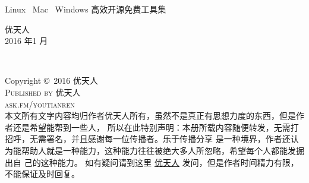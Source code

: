 \documentclass[11pt,fleqn]{book} %
\begin{document}

\begingroup
\thispagestyle{empty}
\centering
\vspace*{8cm}
\par\normalfont\fontsize{35}{35}\sffamily\selectfont
Linux \faLinux\ Mac \faApple\ Windows \faWindows 高效开源免费工具集\par %
\vspace*{0.5cm}
{\huge \faWeibo 优天人 \\ 2016 年1 月}\par %
\endgroup


\newpage
~\vfill
\thispagestyle{empty}

\noindent Copyright \copyright\ 2016 优天人\\ %

\noindent \textsc{Published by 优天人}\\ %

\noindent \textsc{ask.fm/youtianren}\\ %

\noindent                                                                                        本文所有文字内容均归作者优天人所有，虽然不是真正有思想力度的东西，但是作者还是希望能帮到一些人，
所以在此特别声明：本册所载内容随便转发，无需打招呼，无需署名，并且感谢每一位传播者。乐于传播分享
是一种境界，作者还认为能帮助人就是一种能力，这种能力往往被绝大多人所忽略，希望每个人都能发掘出自
己的这种能力。 如有疑问请到这里 \href{weibo.com/u/2635198437}{\faWeibo 优天人} 发问，但是作者时间精力有限，不能保证及时回复。
\\
\end{document}
